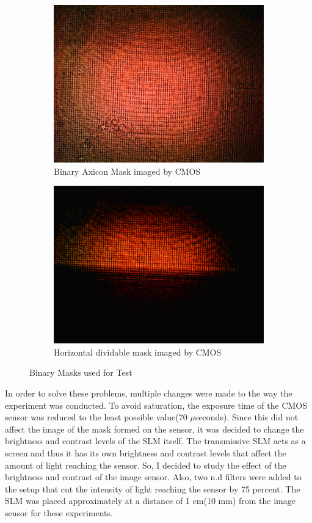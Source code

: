     \begin{figure}[h]
    \centering
    \begin{subfigure}{0.5\textwidth}
    \centering
        \includegraphics[width=0.5\linewidth]{pics/slm/binaryaxiconcmos.jpg}
        \caption{Binary Axicon Mask imaged by CMOS}
        \label{fig:binaryaxiconcmos}
    \end{subfigure}%
    \begin{subfigure}{0.5\textwidth}
    \centering
        \includegraphics[width=0.5\linewidth]{pics/slm/horizontalcmos.jpg}
        \caption{Horizontal dividable mask imaged by CMOS}
        \label{fig:hordivmask}
    \end{subfigure}
    \caption{Binary Masks used for Test}
    \label{fig:InitMaskCMOS}
    \end{figure}
In order to solve these problems, multiple changes were made to the way the experiment was conducted. To avoid saturation, the exposure time of the CMOS sensor was reduced to the least possible value(70 $\mu$seconds). Since this did not affect the image of the mask formed on the sensor, it was decided to change the brightness and contrast levels of the SLM itself. The transmissive SLM acts as a screen and thus it has its own brightness and contrast levels that affect the amount of light reaching the sensor. So, I decided to study the effect of the brightness and contrast of the image sensor. Also, two n.d filters were added to the setup that cut the intensity of light reaching the sensor by 75 percent. The SLM was placed approximately at a distance of 1 cm(10 mm) from the image sensor for these experiments.
